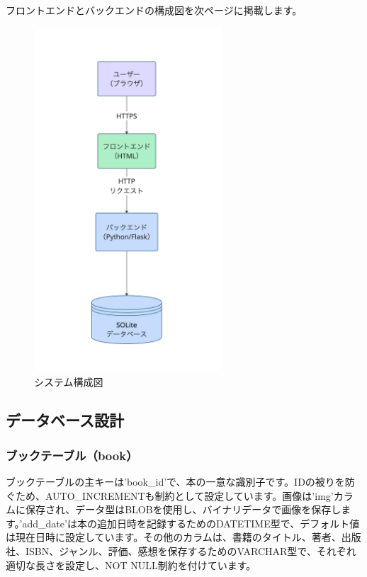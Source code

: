\documentclass[a4paper, 11pt, titlepage]{jsarticle}
\begin{document}
フロントエンドとバックエンドの構成図を次ページに掲載します。
\clearpage
\begin{figure}[htbp]
\centering
\includegraphics[width=70mm]{systemStructure.jpg}
\caption{システム構成図}
\label{fig:func}
\end{figure}


\subsection{データベース設計}
\subsubsection{ブックテーブル（book）}

ブックテーブルの主キーは'book\_id'で、本の一意な識別子です。IDの被りを防ぐため、AUTO\_INCREMENTも制約として設定しています。画像は'img'カラムに保存され、データ型はBLOBを使用し、バイナリデータで画像を保存します。'add\_date'は本の追加日時を記録するためのDATETIME型で、デフォルト値は現在日時に設定しています。その他のカラムは、書籍のタイトル、著者、出版社、ISBN、ジャンル、評価、感想を保存するためのVARCHAR型で、それぞれ適切な長さを設定し、NOT NULL制約を付けています。
\end{document}
